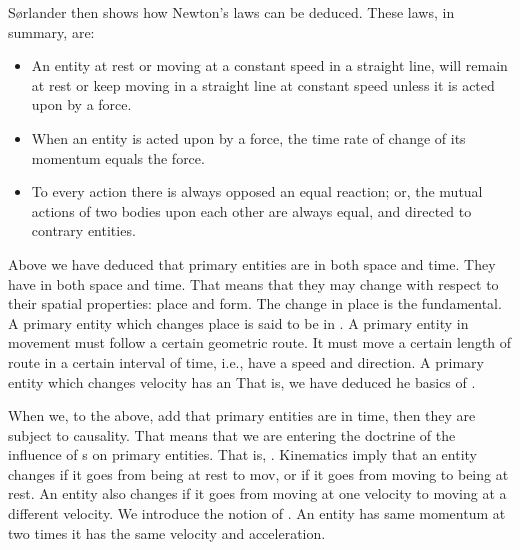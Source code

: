 \begynd
\pind S{\o}rlander then shows how Newton's laws can be deduced.
\pind These laws, in summary, are:
\begin{itemize}
\item {}   
    An entity at rest or moving at a constant speed in a straight
    line, will remain at rest or keep moving in a straight line at
    constant speed unless it is acted upon by a force.  
\item {} 
     When an entity is acted upon by a force, the time rate of change of
     its momentum equals the force.  
\item {} 
    To every action there is always opposed an equal reaction; or, the
    mutual actions of two bodies upon each other are always equal, and
    directed to contrary entities.
\end{itemize}
\afslut

\label{Kinematics}

\begynd
\pind Above we have deduced that primary entities are in both space
      and time.
\begynd
\pind They have   in both space and time.
\pind That means that they may change with respect to their spatial
      properties: place and form.
\pind The change in place is the fundamental.
\pind A primary entity which changes place is said to be in
      . %
\pind A primary entity in {movement} must follow a certain geometric route.
\pind It must move a certain length of route in a certain interval of
      time, i.e., have a  speed and
      direction. %
\pind A primary entity which changes velocity has an
\pind That is, we have deduced he basics of
      . %
\afslut 
\afslut

\label{Dynamics}

\begynd
\pind When we, to the above, add that primary entities are in time, \nyl
      then they are subject to causality.
\begynd
\pind That means that we are entering the doctrine of the influence of
      s on primary entities.
\pind That is, . %
\pind Kinematics imply that an entity changes if it goes from being at
      rest to mov, \nyl or if it goes from moving to being at rest.
\pind An entity also changes if it goes from moving at one velocity to
      moving at a different velocity.
\pind We introduce the notion of . %
\pind An entity has  same momentum at two
      times  it has the same
      velocity and acceleration.
\afslut 
\afslut


